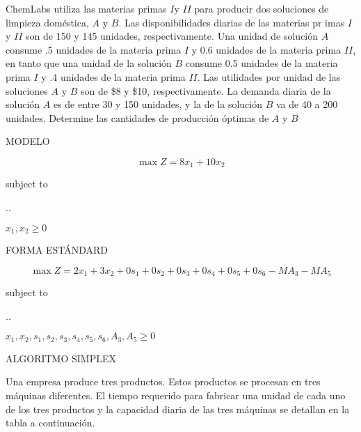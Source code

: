 \documentclass[spanish,letterpaper,11pt]{exam}
\author{Dr. Rafael Torres Escobar}
\begin{document}
\begin{questions}
    \question
ChemLabs utiliza las materias primas $I$y $II$ para producir dos soluciones de limpieza doméstica, $A$ y $B$. Las disponibilidades diarias de las materias pr imas $I$y $II$ son de 150 y 145 unidades, respectivamente. Una unidad de solución $A$ consume .5 unidades de la materia prima $I$ y 0.6 unidades de la materia prima $II$, en tanto que una unidad de la solución $B$ consume 0.5 unidades de la materia prima $I$ y .4 unidades de la materia prima $II$. Las utilidades por unidad de las soluciones $A$ y $B$ son de \$8 y \$10, respectivamente. La demanda diaria de la solución $A$ es de entre 30 y 150 unidades, y la de la solución $B$ va de 40 a 200 unidades. Determine las cantidades de producción óptimas de $A$ y $B$



\begin{solution}

  MODELO

  \[ \max Z = 8x_1 + 10x_2\]
{\centering
  subject to

  \sysdelim..%

  $x_1, x_2 \geq 0$
  \par}

        
  FORMA ESTÁNDARD 

        \[ \max Z = 2x_1 + 3x_2 + 0s_1 + 0s_2 + 0s_3 + 0s_4 + 0s_5 + 0s_6 - MA_3 - MA_5\]
        {\centering
          subject to
        
          \sysdelim..%
        
          $x_1, x_2, s_1, s_2, s_3, s_4, s_5, s_6, A_3, A_5 \geq 0$
          \par}

        ALGORITMO SIMPLEX




    \end{solution}

    \vspace{1cm}
    \question
  Una empresa produce tres productos. Estos productos se procesan en tres máquinas diferentes. El tiempo requerido para fabricar una unidad de cada uno de los tres productos y la capacidad diaria de las tres máquinas se detallan en la tabla a continuación.


\end{questions}
\end{document}
